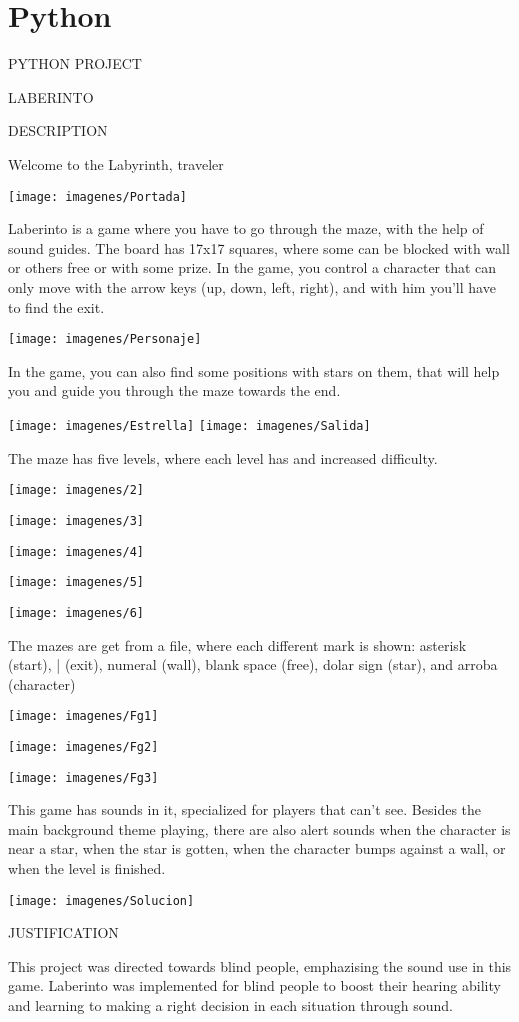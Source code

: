 
\chapter{Python}

PYTHON PROJECT

LABERINTO

DESCRIPTION

Welcome to the Labyrinth, traveler

\centerline{\texttt{[image: imagenes/Portada]} }

Laberinto is a game where you have to go through the maze, with the help of sound guides. The board has 17x17 squares, where some can be blocked with wall or others free or with some prize.
In the game, you control a character that can only move with the arrow keys (up, down, left, right), and with him you'll have to find the exit.

\centerline{\texttt{[image: imagenes/Personaje]} }

In the game, you can also find some positions with stars on them, that will help you and guide you through the maze towards the end.

\centerline{\texttt{[image: imagenes/Estrella]} \texttt{[image: imagenes/Salida]}}


The maze has five levels, where each level has and increased difficulty.

\centerline{\texttt{[image: imagenes/2]} }
\centerline{\texttt{[image: imagenes/3]} }
\centerline{\texttt{[image: imagenes/4]} }
\centerline{\texttt{[image: imagenes/5]} }
\centerline{\texttt{[image: imagenes/6]} }

The mazes are get from a file, where each different mark is shown: asterisk (start), | (exit), numeral (wall), blank space (free), dolar sign (star), and arroba (character)
\centerline{\texttt{[image: imagenes/Fg1]} }
\centerline{\texttt{[image: imagenes/Fg2]} }
\centerline{\texttt{[image: imagenes/Fg3]} }
This game has sounds in it, specialized for players that can't see. Besides the main background theme playing, there are also alert sounds when the character is near a star, when the star is gotten, when the character bumps against a wall, or when the level is finished.
\centerline{\texttt{[image: imagenes/Solucion]} }

JUSTIFICATION

This project was directed towards blind people, emphazising the sound use in this game. Laberinto was implemented for blind people to boost their hearing ability and learning to making a right decision in each situation through sound.

